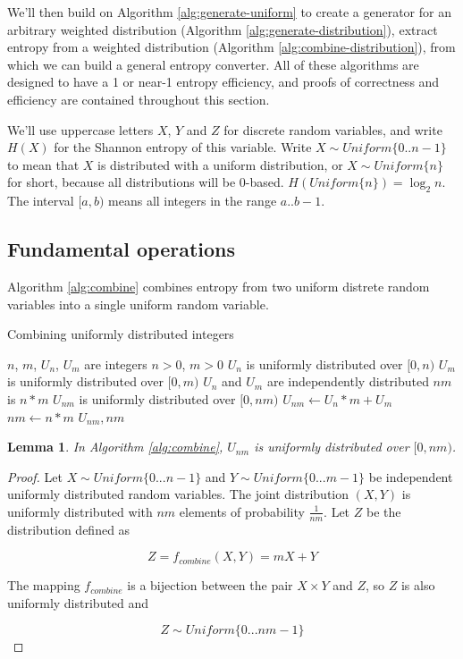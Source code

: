 \documentclass[12pt]{article}
\newtheorem{lemma}{Lemma}
\begin{document}
We'll then build on Algorithm \ref{alg:generate-uniform} to create a generator for an arbitrary weighted distribution (Algorithm \ref{alg:generate-distribution}), extract entropy from a weighted distribution (Algorithm \ref{alg:combine-distribution}), from which we can build a general entropy converter. All of these algorithms are designed to have a 1 or near-1 entropy efficiency, and proofs of correctness and efficiency are contained throughout this section.

We'll use uppercase letters $X$, $Y$ and $Z$ for discrete random variables, and write $H(X)$ for the Shannon entropy of this variable. Write $X \sim Uniform\{0..n-1\}$ to mean that $X$ is distributed with a uniform distribution, or $X \sim Uniform\{n\}$ for short, because all distributions will be 0-based. $H(Uniform\{n\}) = \log_2n$. The interval $[a,b)$ means all integers in the range $a..b-1$.


\subsection{Fundamental operations}


Algorithm \ref{alg:combine} combines entropy from two uniform distrete random variables into a single uniform random variable.

\begin{algorithm}
\caption{Combining uniformly distributed integers}
\label{alg:combine}
\begin{algorithmic}[1]
    \Require $n$, $m$, $U_n$, $U_m$ are integers
    \Require $n>0$, $m>0$
    \Require $U_n$ is uniformly distributed over $[0,n)$
    \Require $U_m$ is uniformly distributed over $[0,m)$
    \Require $U_n$ and $U_m$ are independently distributed
    \Ensure $nm$ is $n * m$
    \Ensure $U_{nm}$ is uniformly distributed over $[0,nm)$
  \State $U_{nm} \gets U_n * m + U_m$
  \State $nm \gets n * m$
  \State \Return $U_{nm}, nm$
\EndProcedure
\end{algorithmic}
\end{algorithm}

\begin{lemma}
In Algorithm \ref{alg:combine}, $U_{nm}$ is uniformly distributed over $[0,nm)$.
\label{lem:combine}
\end{lemma}

\begin{proof}
Let $X \sim Uniform \{0 ... n-1\}$ and $Y \sim Uniform\{0 ... m-1\}$ be independent uniformly distributed random variables. The joint distribution $(X,Y)$ is uniformly distributed with $nm$ elements of probability $\frac{1}{nm}$. Let $Z$ be the distribution defined as

\begin{equation}
Z = f_{combine}(X,Y) = mX+Y
\end{equation}

The mapping $f_{combine}$ is a bijection between the pair $X \times Y$ and $Z$, so $Z$ is also uniformly distributed and 

\begin{equation}
Z \sim Uniform \{0 ... nm-1\}
\end{equation}
\end{proof}
\end{document}
